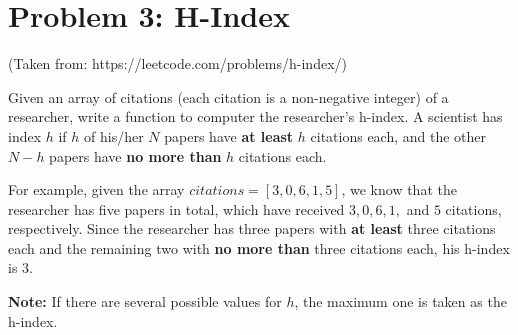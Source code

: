 \normalfont\documentclass[letterpaper,11pt]{article}
\begin{document}
\newpage

\section*{Problem 3: H-Index}
(Taken from: https://leetcode.com/problems/h-index/)

Given an array of citations (each citation is a non-negative integer) of a researcher, write a function to computer the researcher's h-index. A scientist has index $h$ if $h$ of his/her $N$ papers have \textbf{at least} $h$ citations each, and the other $N - h$ papers have \textbf{no more than} $h$ citations each.

For example, given the array $citations = [3, 0, 6, 1 ,5]$, we know that the researcher has five papers in total, which have received $3, 0, 6, 1,$ and $5$ citations, respectively. Since the researcher has three papers with \textbf{at least} three citations each and the remaining two with \textbf{no more than} three citations each, his h-index is 3.

\textbf{Note:} If there are several possible values for $h$, the maximum one is taken as the h-index.
\end{document}
